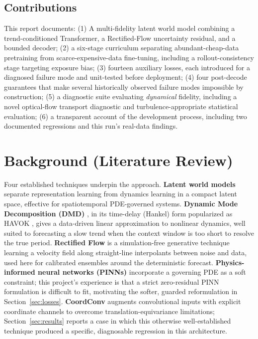 \documentclass[11pt]{article}
\begin{document}
\subsection{Contributions}
This report documents: (1) A multi-fidelity latent world model combining a trend-conditioned Transformer, a Rectified-Flow uncertainty residual, and a bounded decoder; (2) a six-stage curriculum separating abundant-cheap-data pretraining from scarce-expensive-data fine-tuning, including a rollout-consistency stage targeting exposure bias; (3) fourteen auxiliary losses, each introduced for a diagnosed failure mode and unit-tested before deployment; (4) four post-decode guarantees that make several historically observed failure modes impossible by construction; (5) a diagnostic suite evaluating \emph{dynamical} fidelity, including a novel optical-flow transport diagnostic and turbulence-appropriate statistical evaluation; (6) a transparent account of the development process, including two documented regressions and this run's real-data findings.

\section{Background (Literature Review)}
Four established techniques underpin the approach. \textbf{Latent world models} \cite{ha2018worldmodels,kim2024glide} separate representation learning from dynamics learning in a compact latent space, effective for spatiotemporal PDE-governed systems. \textbf{Dynamic Mode Decomposition (DMD)} \cite{schmid2010dmd}, in its time-delay (Hankel) form popularized as HAVOK \cite{brunton2016havok}, gives a data-driven linear approximation to nonlinear dynamics, well suited to forecasting a slow trend when the context window is too short to resolve the true period. \textbf{Rectified Flow} \cite{liu2022rectifiedflow} is a simulation-free generative technique learning a velocity field along straight-line interpolants between noise and data, used here for calibrated ensembles around the deterministic forecast. \textbf{Physics-informed neural networks (PINNs)} \cite{raissi2019pinn} incorporate a governing PDE as a soft constraint; this project's experience is that a strict zero-residual PINN formulation is difficult to fit, motivating the softer, guarded reformulation in Section~\ref{sec:losses}. \textbf{CoordConv} \cite{liu2018coordconv} augments convolutional inputs with explicit coordinate channels to overcome translation-equivariance limitations; Section~\ref{sec:results} reports a case in which this otherwise well-established technique produced a specific, diagnosable regression in this architecture.
\end{document}
